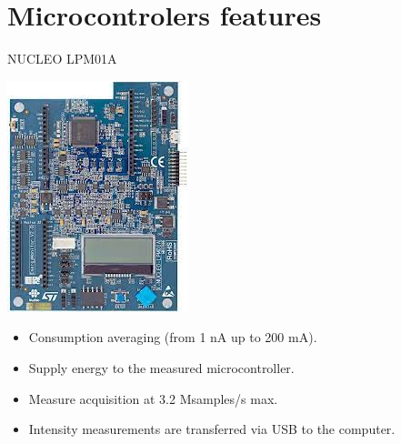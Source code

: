 \documentclass[
	11pt, %
]{beamer}
\begin{document}
\section{Microcontrolers features}

\begin{frame}{NUCLEO LPM01A}
	\centering
    \begin{minipage}{0.4\textwidth}
		\includegraphics[scale = 0.5]{images/lpm01a.jpeg}
	\end{minipage}
	\begin{minipage}{0.50\textwidth}
		\centering
		\begin{itemize}
			\item Consumption averaging (from 1 nA up to 200 mA).
			\item Supply energy to the measured microcontroller.
			\item Measure acquisition at 3.2 Msamples/s max.
			\item Intensity measurements are transferred via USB to the computer.
		\end{itemize}
		\end{minipage}
\end{frame}
\end{document}
